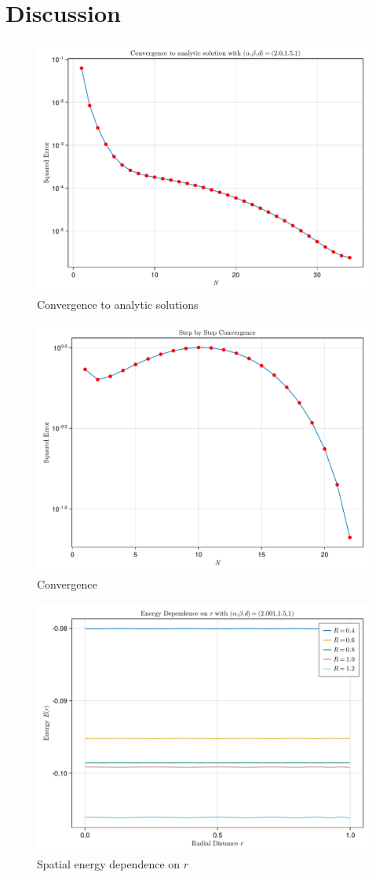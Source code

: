 \section{Discussion}


\begin{figure}[H]
  \centering
  \label{fig:convergence-to-analytic}
  \includegraphics[width=0.7\linewidth]{../figures/results/convergence-to-analytic.pdf}
  \caption{Convergence to analytic solutions}
\end{figure}

\begin{figure}[H]
  \centering
  \label{fig:convergence}
  \includegraphics[width=0.7\linewidth]{../figures/results/convergence.pdf}
  \caption{Convergence}
\end{figure}

\begin{figure}[H]
  \centering
  \label{fig:spatial-energy-dependence}
  \includegraphics[width=0.6\linewidth]{../figures/results/energy-dependence-on-r.pdf}
  \caption{Spatial energy dependence on $r$}
\end{figure}

